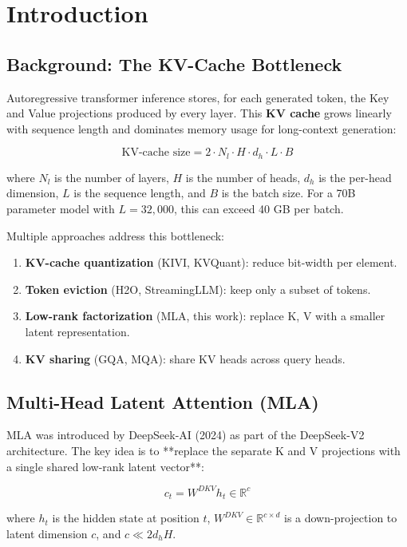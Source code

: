 
\section{Introduction}

\subsection{Background: The KV-Cache Bottleneck}

Autoregressive transformer inference stores, for each generated token, the 
Key and Value projections produced by every layer. This \textbf{KV cache} grows 
linearly with sequence length and dominates memory usage for long-context 
generation:

\[
\text{KV-cache size} = 2 \cdot N_l \cdot H \cdot d_h \cdot L \cdot B
\tag{1.1}
\]

where $N_l$ is the number of layers, $H$ is the number of heads, $d_h$ is the 
per-head dimension, $L$ is the sequence length, and $B$ is the batch size. 
For a 70B parameter model with $L = 32{,}000$, this can exceed 40 GB per 
batch.

Multiple approaches address this bottleneck:

\begin{enumerate}
\item \textbf{KV-cache quantization} (KIVI, KVQuant): reduce bit-width per element.
\item \textbf{Token eviction} (H2O, StreamingLLM): keep only a subset of tokens.
\item \textbf{Low-rank factorization} (MLA, this work): replace K, V with a
  smaller latent representation.
\item \textbf{KV sharing} (GQA, MQA): share KV heads across query heads.

\end{enumerate}
\subsection{Multi-Head Latent Attention (MLA)}

MLA was introduced by DeepSeek-AI (2024) as part of the DeepSeek-V2 
architecture. The key idea is to **replace the separate K and V projections 
with a single shared low-rank latent vector**:

\[
c_t = W^{DKV} h_t \in \mathbb{R}^{c}
\tag{1.2}
\]

where $h_t$ is the hidden state at position $t$, $W^{DKV} \in \mathbb{R}^{c \times d}$ 
is a down-projection to latent dimension $c$, and $c \ll 2 d_h H$.

